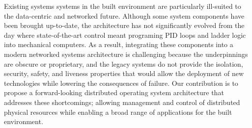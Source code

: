 Existing systems systems in the built environment are particularly ill-suited to the data-centric and networked future.  Although some system components have been brought up-to-date, the architecture has not significantly evolved from the day where state-of-the-art control meant programing PID loops and ladder logic into mechanical computers.  As a result, integrating these components into a modern networked systems architecture is challenging because the underpinnings are obscure or proprietary, and the legacy systems do not provide the isolation, security, safety, and liveness properties that would allow the deployment of new technologies while lowering the consequences of failure.  Our contribution is to propose a forward-looking distributed operating system architecture that addresses these shortcomings; allowing management and control of distributed physical resources while enabling a broad range of applications for the built environment.
